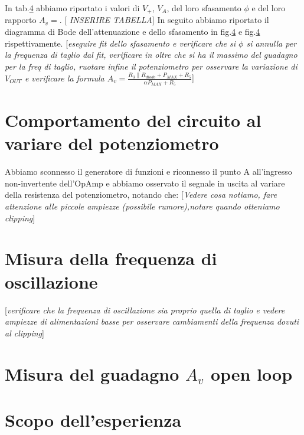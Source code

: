 \documentclass[10pt,a4paper]{article}
\newcommand{\rem}[1]{[\emph{#1}]}
\begin{document}
In tab.\ref{} abbiamo riportato i valori di $V_+$, $V_A$, del loro sfasamento $\phi$ e del loro rapporto $A_v=$. 
\rem{ INSERIRE TABELLA}
In seguito abbiamo riportato il diagramma di Bode dell'attenuazione e dello sfasamento in fig.\ref{} e fig.\ref{} rispettivamente.
\rem{eseguire fit dello sfasamento e verificare che si  $\phi$ si annulla per la frequenza di taglio dal fit, verificare in oltre che si ha il massimo del guadagno per la freq di taglio, ruotare infine il potenziometro per osservare la variazione di  $V_{OUT}$  e verificare la formula $A_v=\frac{R_3\parallel R_{diodo}+P_{MAX}+R_5}{\alpha P_{MAX}+R_5}$}


\section{Comportamento del circuito al variare del potenziometro}
Abbiamo sconnesso il generatore di funzioni e riconnesso il punto A all'ingresso non-invertente dell'OpAmp e abbiamo osservato il segnale in uscita al variare della resistenza del potenziometro, notando che:
\rem{Vedere cosa notiamo, fare attenzione alle piccole ampiezze (possibile rumore),notare quando otteniamo clipping}
\section{Misura della frequenza di oscillazione}
\rem{verificare che la frequenza di oscillazione sia proprio quella di taglio e vedere  ampiezze di alimentazioni basse per osservare  cambiamenti della frequenza dovuti al clipping}
\section{Misura del guadagno $A_v$ open loop}
\section{Scopo dell'esperienza}
\end{document}
